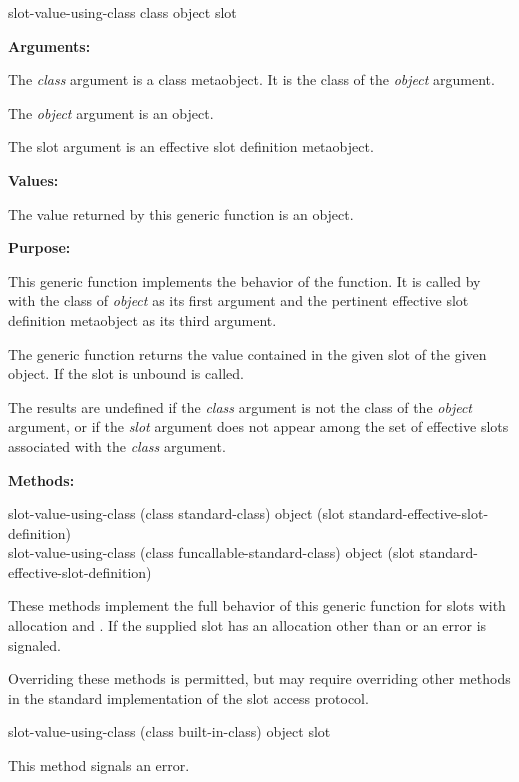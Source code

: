 \begin{defun}
slot-value-using-class class object slot

\textbf{Arguments:}

The \emph{class} argument is a class metaobject. It is the class of the \emph{object} argument.

The \emph{object} argument is an object.

The slot argument is an effective slot definition metaobject.

\textbf{Values:}

The value returned by this generic function is an object.

\textbf{Purpose:}

This generic function implements the behavior of the 
function. It is called by  with the class of \emph{object} as
its first argument and the pertinent effective slot definition metaobject as its
third argument.

The generic function  returns the value contained in
the given slot of the given object. If the slot is unbound  is
called.

The results are undefined if the \emph{class} argument is not the class of the
\emph{object} argument, or if the \emph{slot} argument does not appear among the
set of effective slots associated with the \emph{class} argument.

\textbf{Methods:}

\begin{defun}
slot-value-using-class (class standard-class) object (slot standard-effective-slot-definition) \\
slot-value-using-class (class funcallable-standard-class) object (slot standard-effective-slot-definition)

These methods implement the full behavior of this generic function for slots
with allocation  and . If the supplied slot has an
allocation other than  or  an error is signaled.

Overriding these methods is permitted, but may require overriding other methods
in the standard implementation of the slot access protocol.
\end{defun}

\begin{defun}
slot-value-using-class (class built-in-class) object slot

This method signals an error.
\end{defun}
\end{defun}

